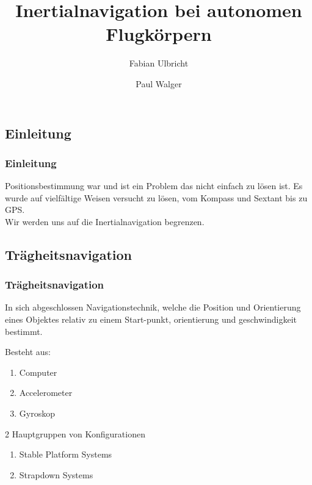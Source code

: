 \documentclass[10pt,a4paper,oneside]{beamer}
\title{Inertialnavigation bei autonomen Flugkörpern}
\author{
	Fabian Ulbricht \and
	Paul Walger 
}
\begin{document}
\frame{
	\titlepage
}


\begin{frame}
  \section{Einleitung}
  \frametitle{Einleitung}
  
  Positionsbestimmung war und ist ein Problem das nicht einfach zu lösen ist.
  Es wurde auf vielfältige Weisen versucht zu lösen, vom Kompass und Sextant bis zu GPS.\\
  Wir werden uns auf die Inertialnavigation begrenzen. 
\end{frame}


\begin{frame}
	\section{Trägheitsnavigation}
	\frametitle{Trägheitsnavigation}
	In sich abgeschlossen Navigationstechnik, 
	welche die Position und Orientierung eines Objektes relativ zu einem Start-punkt, orientierung und geschwindigkeit bestimmt.
	
	Besteht aus:
	\begin{enumerate}
		\item Computer
		\item Accelerometer
		\item Gyroskop
	\end{enumerate}
	
	2 Hauptgruppen von Konfigurationen \cite{Wood07}
	\begin{enumerate}
		\item Stable Platform Systems
		\item Strapdown Systems
	\end{enumerate}
\end{frame}
\end{document}
